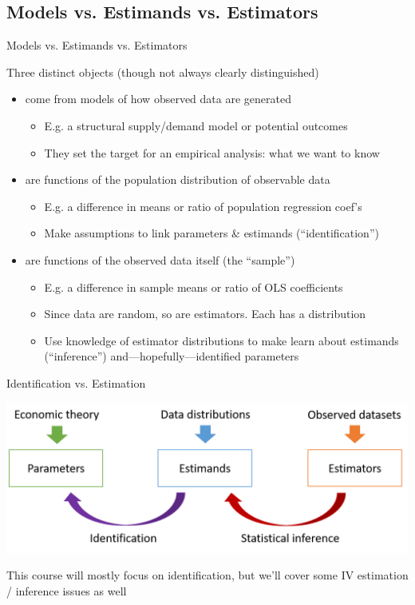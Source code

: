 \documentclass{beamer}
\begin{document}
\subsection{Models vs. Estimands vs. Estimators}
\begin{frame}{Models vs. Estimands vs. Estimators}

Three distinct objects (though not always clearly distinguished) \pause\medskip

\begin{itemize}

  \item {} come from models of how observed data are generated
  \begin{itemize}
    \item E.g. a structural supply/demand model or potential outcomes
    \item They set the target for an empirical analysis: what we want to know
  \end{itemize}\pause
  
  \item {} are functions of the population distribution of observable data
  \begin{itemize}
    \item E.g. a difference in means or ratio of population regression coef's
    \item Make assumptions to link parameters \& estimands (``identification'')
  \end{itemize}\pause
  
  \item {} are functions of the observed data itself (the ``sample'')
  \begin{itemize}
    \item E.g. a difference in sample means or ratio of OLS coefficients 
    \item Since data are random, so are estimators. Each has a distribution
    \item Use knowledge of estimator distributions to make learn about estimands (``inference'') and---hopefully---identified parameters
  \end{itemize}
\end{itemize}
\end{frame}

\begin{frame}{Identification vs. Estimation}


\includegraphics[scale=0.37]{./lecture_includes/BigPicture.png}
\medskip

This course will mostly focus on identification, but we'll cover some IV estimation / inference issues as well
\end{frame}
\end{document}
